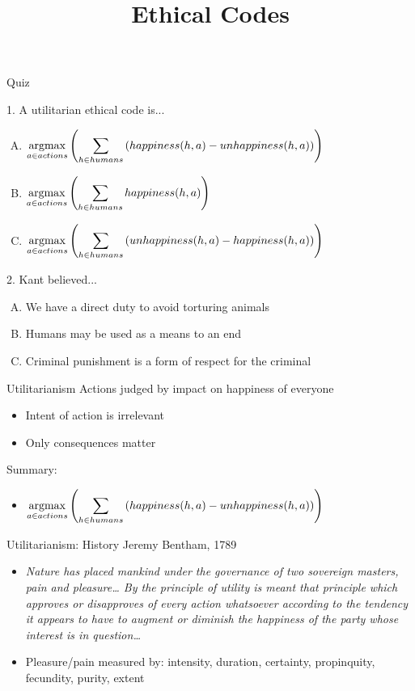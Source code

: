 \documentclass{beamer}
\title[Ethical Codes]{Ethical Codes}
\date{}
\begin{document}
\begin{frame}
\titlepage
\end{frame}

\begin{frame}{Quiz}

\begin{block}{1. A utilitarian ethical code is...}
\begin{enumerate}[(A)]
\item<1-3> $\displaystyle \operatorname*{argmax}_{a \in actions} \left( \sum_{h \in humans} \left( happiness(h, a) - unhappiness(h, a)\right)\right)$
\item<1> $\displaystyle \operatorname*{argmax}_{a \in actions} \left( \sum_{h \in humans} happiness(h, a)\right)$
\item<1> $\displaystyle \operatorname*{argmax}_{a \in actions} \left( \sum_{h \in humans} \left( unhappiness(h, a) - happiness(h, a)\right)\right)$
\end{enumerate}
\end{block}
\begin{block}{2. Kant believed...}
\begin{enumerate}[(A)]
\item<1-2> We have a direct duty to avoid torturing animals
\item<1-2> Humans may be used as a means to an end
\item<1-3> Criminal punishment is a form of respect for the criminal
\end{enumerate}
\end{block}
\end{frame}

\begin{frame}{Utilitarianism}
Actions judged by impact on happiness of everyone
\begin{itemize}
\item Intent of action is irrelevant
\item Only consequences matter
\end{itemize}
\bigskip
Summary:
\begin{itemize}
\item $\displaystyle \operatorname*{argmax}_{a \in actions} \left( \sum_{h \in humans} \left( happiness(h, a) - unhappiness(h, a)\right)\right)$
\end{itemize}
\end{frame}

\begin{frame}{Utilitarianism: History}
Jeremy Bentham, 1789
\begin{itemize}
\item \textit{Nature has placed mankind under the governance of two sovereign masters, pain and pleasure\ldots
By the principle of utility is meant that principle which approves or disapproves of every action whatsoever according to the tendency it appears to have to augment or diminish the happiness of the party whose interest is in question\ldots}
\item Pleasure/pain measured by: intensity, duration, certainty, propinquity, fecundity, purity, extent
\end{itemize}
\end{frame}
\end{document}
